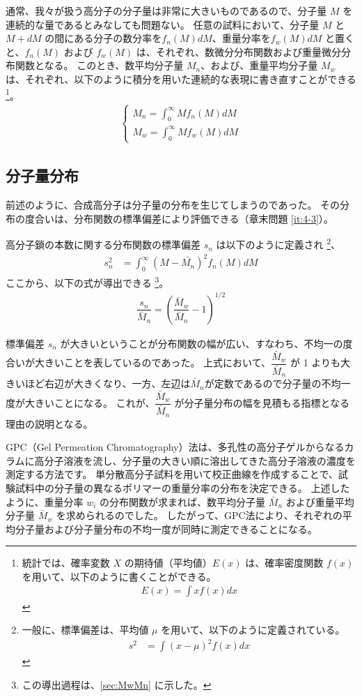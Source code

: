 \documentclass[a4paper,11pt]{jlreq}
\begin{document}
通常、我々が扱う高分子の分子量は非常に大きいものであるので、分子量 $M$ を連続的な量であるとみなしても問題ない。
任意の試料において、分子量 $M$ と $M+dM$ の間にある分子の数分率を$f_n(M)dM$、重量分率を$f_w(M)dM$ と置くと、$f_n(M)$ および $f_w(M)$ は、それぞれ、数微分分布関数および重量微分分布関数となる。
このとき、数平均分子量 $M_n$、および、重量平均分子量 $M_w$ は、それぞれ、以下のように積分を用いた連続的な表現に書き直すことができる
\footnote
{
統計では、確率変数 $X$ の期待値（平均値）$E(x)$ は、確率密度関数 $f(x)$ を用いて、以下のように書くことができる。
\begin{align*}
E(x) = \displaystyle \int x f(x) dx
\end{align*}
}。
\begin{align}
\begin{cases}
M_n = \displaystyle\int_0^{\infty} M f_n (M)dM \\[10pt]
M_w = \displaystyle\int_0^{\infty} M f_w (M)dM
\end{cases}
\end{align}

\subsection{分子量分布}

前述のように、合成高分子は分子量の分布を生じてしまうのであった。
その分布の度合いは、分布関数の標準偏差により評価できる（章末問題 \ref{it:4-3}）。

高分子鎖の本数に関する分布関数の標準偏差 $s_n$ は以下のように定義され
\footnote
{
一般に、標準偏差は、平均値 $\mu$ を用いて、以下のように定義されている。
\begin{align*}
s^2
	&= \displaystyle \int(x - \mu)^2 f(x) dx
\end{align*}
}、
\begin{align}
s_n^2
	&= \displaystyle \int_0^{\infty}(M - \bar{M_n})^2 f_n(M) dM
\end{align}
ここから、以下の式が導出できる
\footnote
{
この導出過程は、\ref{sec:MwMn} に示した。
}。
\begin{align}
\dfrac{s_n}{\bar{M}_n} = \left(\dfrac{\bar{M}_w}{\bar{M}_n}-1\right)^{1/2}
\end{align}

標準偏差 $s_n$ が大きいということが分布関数の幅が広い、すなわち、不均一の度合いが大きいことを表しているのであった。
上式において、$\dfrac{\bar{M}_w}{\bar{M}_n}$ が 1 よりも大きいほど右辺が大きくなり、一方、左辺は$\bar{M}_n$が定数であるので分子量の不均一度が大きいことになる。
これが、$\dfrac{\bar{M}_w}{\bar{M}_n}$ が分子量分布の幅を見積もる指標となる理由の説明となる。
 
GPC（Gel Permeation Chromatography）法は、多孔性の高分子ゲルからなるカラムに高分子溶液を流し、分子量の大きい順に溶出してきた高分子溶液の濃度を測定する方法です。
単分散高分子試料を用いて校正曲線を作成することで、試験試料中の分子量の異なるポリマーの重量分率の分布を決定できる。
上述したように、重量分率 $w_i$ の分布関数が求まれば、数平均分子量 $\bar{M}_n$ および重量平均分子量 $\bar{M}_w$ を求められるのでした。
したがって、GPC法により、それぞれの平均分子量および分子量分布の不均一度が同時に測定できることになる。
\end{document}
